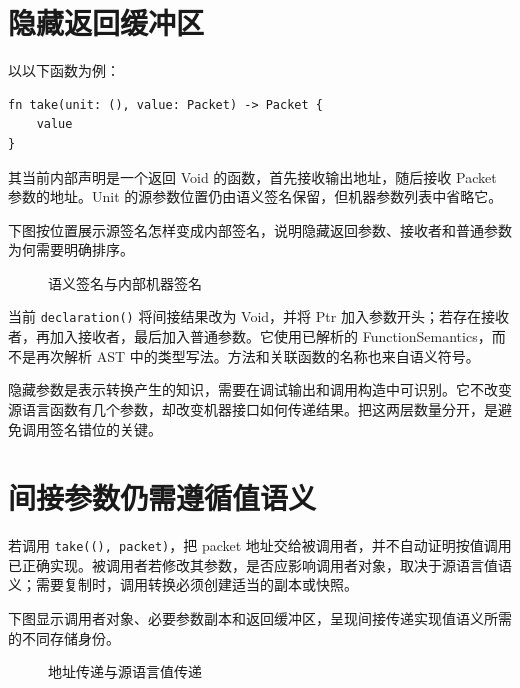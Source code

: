 \section{隐藏返回缓冲区}
以以下函数为例：
\begin{lstlisting}[language=Rustless,caption={包含 Unit 参数的聚合返回}]
fn take(unit: (), value: Packet) -> Packet {
    value
}
\end{lstlisting}
其当前内部声明是一个返回 Void 的函数，首先接收输出地址，随后接收 Packet 参数的地址。Unit 的源参数位置仍由语义签名保留，但机器参数列表中省略它。

下图按位置展示源签名怎样变成内部签名，说明隐藏返回参数、接收者和普通参数为何需要明确排序。
\begin{figure}[htbp]\centering
{}
\caption{语义签名与内部机器签名}
\end{figure}

当前 \texttt{declaration()} 将间接结果改为 Void，并将 Ptr 加入参数开头；若存在接收者，再加入接收者，最后加入普通参数。它使用已解析的 FunctionSemantics，而不是再次解析 AST 中的类型写法。方法和关联函数的名称也来自语义符号。

隐藏参数是表示转换产生的知识，需要在调试输出和调用构造中可识别。它不改变源语言函数有几个参数，却改变机器接口如何传递结果。把这两层数量分开，是避免调用签名错位的关键。

\section{间接参数仍需遵循值语义}
若调用 \texttt{take((), packet)}，把 packet 地址交给被调用者，并不自动证明按值调用已正确实现。被调用者若修改其参数，是否应影响调用者对象，取决于源语言值语义；需要复制时，调用转换必须创建适当的副本或快照。

下图显示调用者对象、必要参数副本和返回缓冲区，呈现间接传递实现值语义所需的不同存储身份。
\begin{figure}[htbp]\centering
{}
\caption{地址传递与源语言值传递}
\end{figure}

